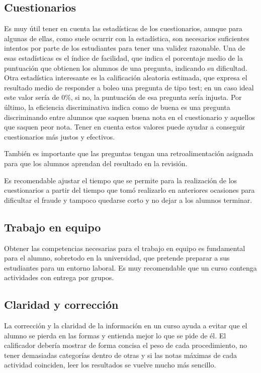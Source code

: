 \subsection{Cuestionarios}
Es muy útil tener en cuenta las estadísticas de los cuestionarios, aunque para algunas de ellas, como suele ocurrir con la estadística, son necesarios suficientes intentos por parte de los estudiantes para tener una validez razonable. Una de esas estadísticas es el índice de facilidad, que indica el porcentaje medio de la puntuación que obtienen los alumnos de una pregunta, indicando su dificultad. Otra estadística interesante es la calificación aleatoria estimada, que expresa el resultado medio de responder a boleo una pregunta de tipo test; en un caso ideal este valor sería de 0\%, si no, la puntuación de esa pregunta sería injusta. Por último, la eficiencia discriminativa indica como de buena es una pregunta discriminando entre alumnos que saquen buena nota en el cuestionario y aquellos que saquen peor nota. Tener en cuenta estos valores puede ayudar a conseguir cuestionarios más justos y efectivos.

También es importante que las preguntas tengan una retroalimentación asignada para que los alumnos aprendan del resultado en la revisión.

Es recomendable ajustar el tiempo que se permite para la realización de los cuestionarios a partir del tiempo que tomó realizarlo en anteriores ocasiones para dificultar el fraude y tampoco quedarse corto y no dejar a los alumnos terminar.

\subsection{Trabajo en equipo}
Obtener las competencias necesarias para el trabajo en equipo es fundamental para el alumno, sobretodo en la universidad, que pretende preparar a sus estudiantes para un entorno laboral. Es muy recomendable que un curso contenga actividades con entrega por grupos.

\subsection{Claridad y corrección}
La corrección y la claridad de la información en un curso ayuda a evitar que el alumno se pierda en las formas y entienda mejor lo que se pide de él.
El calificador debería mostrar de forma concisa el peso de cada procedimiento, no tener demasiadas categorías dentro de otras y si las notas máximas de cada actividad coinciden, leer los resultados se vuelve mucho más sencillo.


